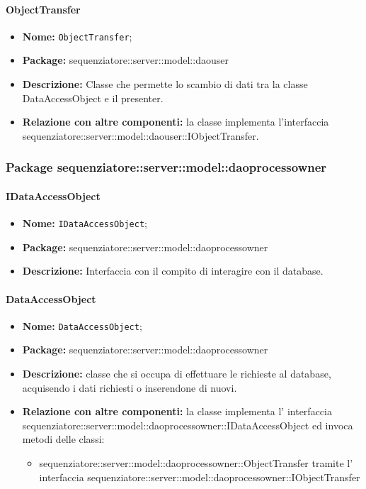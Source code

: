 \paragraph{ObjectTransfer}
	\begin{itemize}
		\item \textbf{Nome:} \texttt{ObjectTransfer};
		\item \textbf{Package:} sequenziatore::server::model::daouser
		\item \textbf{Descrizione:} Classe che permette lo scambio di dati tra la classe DataAccessObject e il presenter.
		\item \textbf{Relazione con altre componenti:} la classe implementa l'interfaccia sequenziatore::server::model::daouser::IObjectTransfer.
	\end{itemize}
\subsubsection{Package sequenziatore::server::model::daoprocessowner}
\paragraph{IDataAccessObject}
	\begin{itemize}
		\item \textbf{Nome:} \texttt{IDataAccessObject};
		\item \textbf{Package:} sequenziatore::server::model::daoprocessowner
		\item \textbf{Descrizione:} Interfaccia con il compito di interagire con il database.
	\end{itemize}
\paragraph{DataAccessObject}
\begin{itemize}
		\item \textbf{Nome:} \texttt{DataAccessObject};
		\item \textbf{Package:} sequenziatore::server::model::daoprocessowner
		\item \textbf{Descrizione:} classe che si occupa di effettuare le richieste al database, acquisendo i dati richiesti o inserendone di nuovi.
		\item \textbf{Relazione con altre componenti:} la classe implementa l' interfaccia sequenziatore::server::model::daoprocessowner::IDataAccessObject ed invoca metodi delle classi:
		\begin{itemize}
			\item sequenziatore::server::model::daoprocessowner::ObjectTransfer tramite l' interfaccia sequenziatore::server::model::daoprocessowner::IObjectTransfer
		\end{itemize}
\end{itemize}
